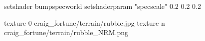 setshader bumpspecworld
setshaderparam "specscale" 0.2 0.2 0.2

texture 0 craig_fortune/terrain/rubble.jpg
texture n craig_fortune/terrain/rubble_NRM.png